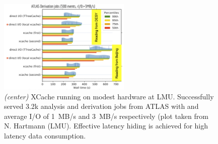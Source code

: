 \begin{figure}[h]
  \centering
  \includegraphics[height=4.5cm]{lmu.png}
  \caption{{\em (center)} XCache running on modest hardware at LMU. Successfully served 3.2k analysis and derivation jobs from ATLAS with and average I/O of 1~MB/s and 3~MB/s respectively (plot taken from N. Hartmann (LMU). Effective latency hiding is achieved for high latency data consumption.}
  \label{lmu-xcache}
\end{figure}





